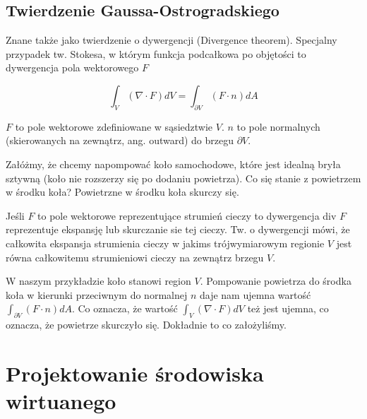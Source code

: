 \documentclass[12pt]{article}
\begin{document}
\subsection{Twierdzenie Gaussa-Ostrogradskiego}

Znane także jako twierdzenie o dywergencji (Divergence theorem).
Specjalny przypadek tw. Stokesa, w którym funkcja podcałkowa po objętości to dywergencja pola wektorowego $F$

\begin{equation}
\int_{V} (\nabla \cdot F) dV = \int_{\partial V} (F \cdot n) dA
\end{equation}

$F$ to pole wektorowe zdefiniowane w sąsiedztwie $V$. $n$ to pole normalnych (skierowanych na zewnątrz, ang. outward) do brzegu $\partial V$.

Załóżmy, że chcemy napompować koło samochodowe, które jest idealną bryła sztywną (koło nie rozszerzy się po dodaniu powietrza). Co się stanie z powietrzem w środku koła? Powietrzne w środku koła skurczy się.

Jeśli $F$ to pole wektorowe reprezentujące strumień cieczy to dywergencja div $F$ reprezentuje ekspansję lub skurczanie sie tej cieczy. Tw. o dywergencji mówi, że całkowita ekspansja strumienia cieczy w jakims trójwymiarowym regionie $V$ jest równa całkowitemu strumieniowi cieczy na zewnątrz brzegu $V$.

W naszym przykładzie koło stanowi region $V$. Pompowanie powietrza do środka koła w kierunki przeciwnym do normalnej $n$ daje nam ujemna wartość $\int_{\partial V} (F \cdot n) dA$. Co oznacza, że wartość $\int_{V} (\nabla \cdot F) dV$ też jest ujemna, co oznacza, że powietrze skurczyło się. Dokładnie to co założyliśmy.

\section{Projektowanie środowiska wirtuanego}
\end{document}
